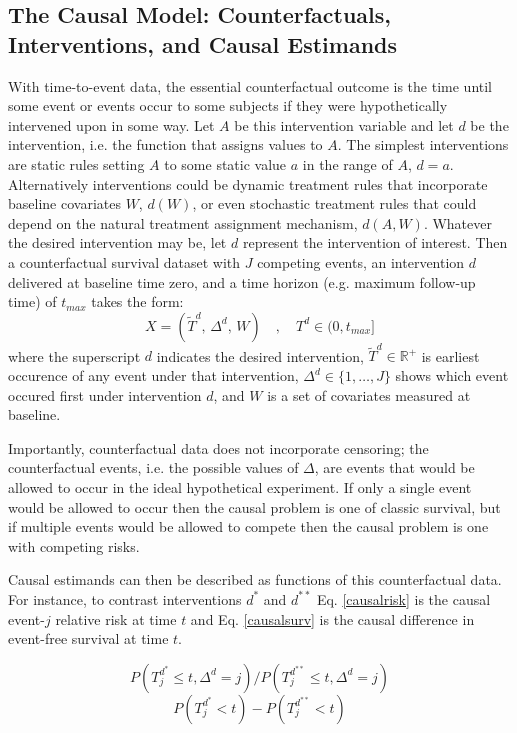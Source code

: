 \documentclass{report}
\newcommand{\1}{\ensuremath{\mathbf{1}}}
\newcommand{\T}{\ensuremath{\widetilde{T}}}
\renewcommand{\L}{\ensuremath{W}}
\begin{document}
\subsection{The Causal Model: Counterfactuals, Interventions, and Causal Estimands}
\label{sec:org047a0c3}
With time-to-event data, the essential counterfactual outcome is the time until some event or events occur to some subjects if they were hypothetically intervened upon in some way. Let \(A\) be this intervention variable and let \(d\) be the intervention, i.e. the function that assigns values to \(A\). The simplest interventions are static rules setting \(A\) to some static value \(a\) in the range of \(A\), \(d = a\). Alternatively interventions could be dynamic treatment rules that incorporate baseline covariates \(\L\), \(d(\L)\), or even stochastic treatment rules that could depend on the natural treatment assignment mechanism, \(d(A, \L)\). Whatever the desired intervention may be, let \(d\) represent the intervention of interest. Then a counterfactual survival dataset with \(J\) competing events, an intervention \(d\) delivered at baseline time zero, and a time horizon (e.g. maximum follow-up time) of \(t_{max}\) takes the form:
\begin{equation}
 X = \left(\T^d,\, \Delta^d,\, \L \right) \quad,\quad T^d \in (0, t_{max}] \label{causaldata}
\end{equation}
where the superscript \(d\) indicates the desired intervention, \(\T^d \in \mathbb{R}^+\) is earliest occurence of any event under that intervention, \(\Delta^d \in \{1, \dots, J\}\) shows which event occured first under intervention \(d\), and \(\L\) is a set of covariates measured at baseline.

Importantly, counterfactual data does not incorporate censoring; the counterfactual events, i.e. the possible values of \(\Delta\), are events that would be allowed to occur in the ideal hypothetical experiment. If only a single event would be allowed to occur then the causal problem is one of classic survival, but if multiple events would be allowed to compete then the causal problem is one with competing risks. 

Causal estimands can then be described as functions of this counterfactual data. For instance, to contrast interventions \(d^*\) and \(d^{**}\) Eq. \eqref{causalrisk} is the causal event-\(j\) relative risk at time \(t\) and Eq. \eqref{causalsurv} is the causal difference in event-free survival at time \(t\). 

\begin{equation}
P(T^{d^*}_j \leq t, \Delta^d = j) / P(T^{d^{**}}_j \leq t, \Delta^d = j) \label{causalrisk}
\end{equation}
\begin{equation}
P(T^{d^*}_j < t) - P(T^{d^{**}}_j < t) \label{causalsurv}
\end{equation}
\end{document}
